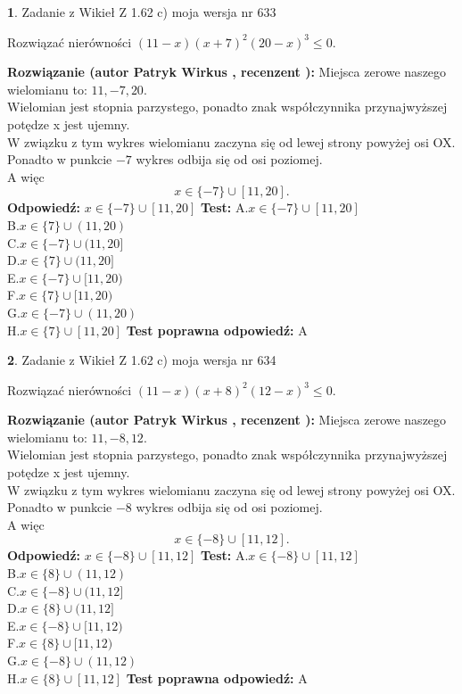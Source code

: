 \documentclass[12pt, a4paper]{article}
\theoremstyle{definition} %
\newtheorem{zad}{}
\newcommand{\zadStart}[1]{\begin{zad}#1\newline}
\newcommand{\zadStop}{\end{zad}}
\newcommand{\rozwStart}[2]{\noindent \textbf{Rozwiązanie (autor #1 , recenzent #2): }\newline}
\newcommand{\rozwStop}{\newline}
\newcommand{\odpStart}{\noindent \textbf{Odpowiedź:}\newline}
\newcommand{\odpStop}{\newline}
\newcommand{\testStart}{\noindent \textbf{Test:}\newline}
\newcommand{\testStop}{\newline}
\newcommand{\kluczStart}{\noindent \textbf{Test poprawna odpowiedź:}\newline}
\newcommand{\kluczStop}{\newline}
\begin{document}
\zadStart{Zadanie z Wikieł Z 1.62 c) moja wersja nr 633}

Rozwiązać nierówności $(11-x)(x+7)^{2}(20-x)^{3}\le0$.
\zadStop
\rozwStart{Patryk Wirkus}{}
Miejsca zerowe naszego wielomianu to: $11, -7, 20$.\\
Wielomian jest stopnia parzystego, ponadto znak współczynnika przy\linebreak najwyższej potędze x jest ujemny.\\ W związku z tym wykres wielomianu zaczyna się od lewej strony powyżej osi OX.\\
Ponadto w punkcie $-7$ wykres odbija się od osi poziomej.\\
A więc $$x \in \{-7\} \cup [11,20].$$
\rozwStop
\odpStart
$x \in \{-7\} \cup [11,20]$
\odpStop
\testStart
A.$x \in \{-7\} \cup [11,20]$\\
B.$x \in \{7\} \cup (11,20)$\\
C.$x \in \{-7\} \cup (11,20]$\\
D.$x \in \{7\} \cup (11,20]$\\
E.$x \in \{-7\} \cup [11,20)$\\
F.$x \in \{7\} \cup [11,20)$\\
G.$x \in \{-7\} \cup (11,20)$\\
H.$x \in \{7\} \cup [11,20]$
\testStop
\kluczStart
A
\kluczStop



\zadStart{Zadanie z Wikieł Z 1.62 c) moja wersja nr 634}

Rozwiązać nierówności $(11-x)(x+8)^{2}(12-x)^{3}\le0$.
\zadStop
\rozwStart{Patryk Wirkus}{}
Miejsca zerowe naszego wielomianu to: $11, -8, 12$.\\
Wielomian jest stopnia parzystego, ponadto znak współczynnika przy\linebreak najwyższej potędze x jest ujemny.\\ W związku z tym wykres wielomianu zaczyna się od lewej strony powyżej osi OX.\\
Ponadto w punkcie $-8$ wykres odbija się od osi poziomej.\\
A więc $$x \in \{-8\} \cup [11,12].$$
\rozwStop
\odpStart
$x \in \{-8\} \cup [11,12]$
\odpStop
\testStart
A.$x \in \{-8\} \cup [11,12]$\\
B.$x \in \{8\} \cup (11,12)$\\
C.$x \in \{-8\} \cup (11,12]$\\
D.$x \in \{8\} \cup (11,12]$\\
E.$x \in \{-8\} \cup [11,12)$\\
F.$x \in \{8\} \cup [11,12)$\\
G.$x \in \{-8\} \cup (11,12)$\\
H.$x \in \{8\} \cup [11,12]$
\testStop
\kluczStart
A
\kluczStop
\end{document}
